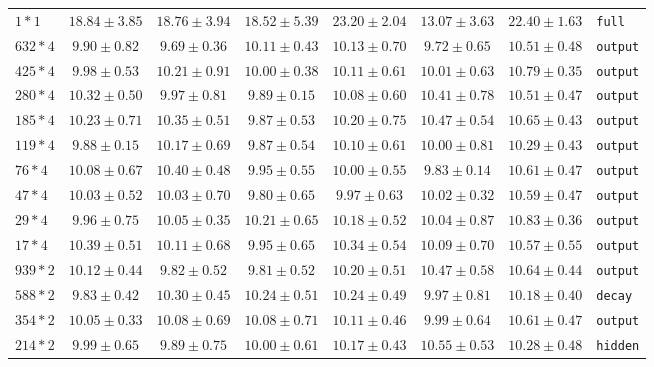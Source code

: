 \documentclass[conference]{IEEEtran}
\begin{document}
\begin{longtable}{@{}lccccccl@{}}
$1*1$ & $18.84 \pm 3.85$ & $18.76 \pm 3.94$ & $18.52 \pm 5.39$ & \bfseries $23.20 \pm 2.04$ & $13.07 \pm 3.63$ & $22.40 \pm 1.63$ & \texttt{full} \\
$632*4$ & $9.90 \pm 0.82$ & $9.69 \pm 0.36$ & $10.11 \pm 0.43$ & $10.13 \pm 0.70$ & $9.72 \pm 0.65$ & \bfseries $10.51 \pm 0.48$ & \texttt{output} \\
$425*4$ & $9.98 \pm 0.53$ & $10.21 \pm 0.91$ & $10.00 \pm 0.38$ & $10.11 \pm 0.61$ & $10.01 \pm 0.63$ & \bfseries $10.79 \pm 0.35$ & \texttt{output} \\
$280*4$ & $10.32 \pm 0.50$ & $9.97 \pm 0.81$ & $9.89 \pm 0.15$ & $10.08 \pm 0.60$ & $10.41 \pm 0.78$ & \bfseries $10.51 \pm 0.47$ & \texttt{output} \\
$185*4$ & $10.23 \pm 0.71$ & $10.35 \pm 0.51$ & $9.87 \pm 0.53$ & $10.20 \pm 0.75$ & $10.47 \pm 0.54$ & \bfseries $10.65 \pm 0.43$ & \texttt{output} \\
$119*4$ & $9.88 \pm 0.15$ & $10.17 \pm 0.69$ & $9.87 \pm 0.54$ & $10.10 \pm 0.61$ & $10.00 \pm 0.81$ & \bfseries $10.29 \pm 0.43$ & \texttt{output} \\
$76*4$ & $10.08 \pm 0.67$ & $10.40 \pm 0.48$ & $9.95 \pm 0.55$ & $10.00 \pm 0.55$ & $9.83 \pm 0.14$ & \bfseries $10.61 \pm 0.47$ & \texttt{output} \\
$47*4$ & $10.03 \pm 0.52$ & $10.03 \pm 0.70$ & $9.80 \pm 0.65$ & $9.97 \pm 0.63$ & $10.02 \pm 0.32$ & \bfseries $10.59 \pm 0.47$ & \texttt{output} \\
$29*4$ & $9.96 \pm 0.75$ & $10.05 \pm 0.35$ & $10.21 \pm 0.65$ & $10.18 \pm 0.52$ & $10.04 \pm 0.87$ & \bfseries $10.83 \pm 0.36$ & \texttt{output} \\
$17*4$ & $10.39 \pm 0.51$ & $10.11 \pm 0.68$ & $9.95 \pm 0.65$ & $10.34 \pm 0.54$ & $10.09 \pm 0.70$ & \bfseries $10.57 \pm 0.55$ & \texttt{output} \\
$939*2$ & $10.12 \pm 0.44$ & $9.82 \pm 0.52$ & $9.81 \pm 0.52$ & $10.20 \pm 0.51$ & $10.47 \pm 0.58$ & \bfseries $10.64 \pm 0.44$ & \texttt{output} \\
$588*2$ & $9.83 \pm 0.42$ & \bfseries $10.30 \pm 0.45$ & $10.24 \pm 0.51$ & $10.24 \pm 0.49$ & $9.97 \pm 0.81$ & $10.18 \pm 0.40$ & \texttt{decay} \\
$354*2$ & $10.05 \pm 0.33$ & $10.08 \pm 0.69$ & $10.08 \pm 0.71$ & $10.11 \pm 0.46$ & $9.99 \pm 0.64$ & \bfseries $10.61 \pm 0.47$ & \texttt{output} \\
$214*2$ & $9.99 \pm 0.65$ & $9.89 \pm 0.75$ & $10.00 \pm 0.61$ & $10.17 \pm 0.43$ & \bfseries $10.55 \pm 0.53$ & $10.28 \pm 0.48$ & \texttt{hidden} \\

\end{longtable}
\end{document}

